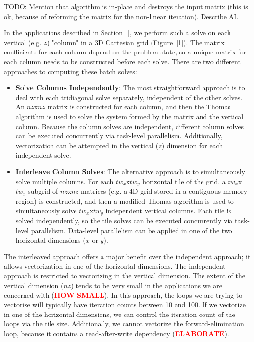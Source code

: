 \documentclass[conference]{IEEEtran}
\newcommand{\fix}[1]{{\bf \textcolor {red}{#1}}}
\begin{document}
TODO: Mention that algorithm is in-place and destroys the input matrix (this is
ok, because of reforming the matrix for the non-linear iteration). Describe
AI.

In the applications described in Section~\ref{}, we perform such a solve on
each vertical (e.g. \(z\)) "column" in a 3D Cartesian grid (Figure~\ref{1}). The
matrix coefficients for each column depend on the problem state, so a unique
matrix for each column needs to be constructed before each solve. There are two
different approaches to computing these batch solves:

\begin{itemize}
\item \textbf{Solve Columns Independently}: The most straightforward approach is to deal with each tridiagonal solve separately, independent of the other solves. An \(nz\)x\(nz\) matrix is constructed for each column, and then the Thomas algorithm is used to solve the system formed by the matrix and the vertical column. Because the column solves are independent, different column solves can be executed concurrently via task-level parallelism. Additionally, vectorization can be attempted in the vertical (\(z\)) dimension for each independent solve. 
\item \textbf{Interleave Column Solves}: The alternative approach is to simultaneously solve multiple columns. For each \(tw_x\)x\(tw_y\) horizontal tile of the grid, a \(tw_x\)x\(tw_y\) subgrid of \(nz\)x\(nz\) matrices (e.g. a 4D grid stored in a contiguous memory region) is constructed, and then a modified Thomas algorithm is used to simultaneously solve \(tw_x\)x\(tw_y\) independent vertical columns. Each tile is solved independently, so the tile solves can be executed concurrently via task-level parallelism. Data-level parallelism can be applied in one of the two horizontal dimensions (\(x\) or \(y\)).
\end{itemize}

The interleaved approach offers a major benefit over the independent approach;
it allows vectorization in one of the horizontal dimensions. The independent
approach is restricted to vectorizing in the vertical dimension. The extent of
the vertical dimension (\(nz\)) tends to be very small in the applications we are
concerned with (\fix{HOW SMALL}). In this approach, the loops we are trying to
vectorize will typically have iteration counts between 10 and 100. If we
vectorize in one of the horizontal dimensions, we can control the iteration
count of the loops via the tile size. Additionally, we cannot vectorize the
forward-elimination loop, because it contains a read-after-write dependency
(\fix{ELABORATE}).
\end{document}
